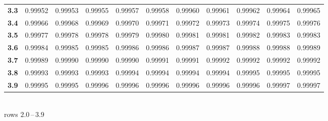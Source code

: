 \begin{minipage}[t]{0.49\textwidth}
{\begin{tabular}{@{}r|*{10}{c}@{}}
    \textbf{3.3} & 0.99952 & 0.99953 & 0.99955 & 0.99957 & 0.99958 & 0.99960 & 0.99961 & 0.99962 & 0.99964 & 0.99965 \\
    \textbf{3.4} & 0.99966 & 0.99968 & 0.99969 & 0.99970 & 0.99971 & 0.99972 & 0.99973 & 0.99974 & 0.99975 & 0.99976 \\
    \textbf{3.5} & 0.99977 & 0.99978 & 0.99978 & 0.99979 & 0.99980 & 0.99981 & 0.99981 & 0.99982 & 0.99983 & 0.99983 \\
    \textbf{3.6} & 0.99984 & 0.99985 & 0.99985 & 0.99986 & 0.99986 & 0.99987 & 0.99987 & 0.99988 & 0.99988 & 0.99989 \\
    \textbf{3.7} & 0.99989 & 0.99990 & 0.99990 & 0.99990 & 0.99991 & 0.99991 & 0.99992 & 0.99992 & 0.99992 & 0.99992 \\
    \textbf{3.8} & 0.99993 & 0.99993 & 0.99993 & 0.99994 & 0.99994 & 0.99994 & 0.99994 & 0.99995 & 0.99995 & 0.99995 \\
    \textbf{3.9} & 0.99995 & 0.99995 & 0.99996 & 0.99996 & 0.99996 & 0.99996 & 0.99996 & 0.99996 & 0.99997 & 0.99997 \\
    \bottomrule
\end{tabular}%
}\\[0.35em]
{\footnotesize rows $2.0$\,--\,$3.9$}
\end{minipage}
